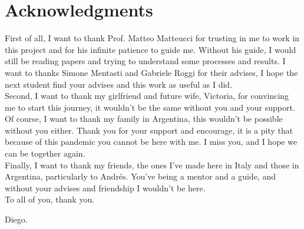 
\bigskip

\begingroup
\let\clearpage\relax
\let\cleardoublepage\relax
\let\cleardoublepage\relax
\chapter*{Acknowledgments}

First of all, I want to thank Prof. Matteo Matteucci for trusting in me to work in this project and for his infinite patience to guide me. Without his guide, I would still be reading papers and trying to understand some processes and results. I want to thanks Simone Mentasti and Gabriele Roggi for their advises, I hope the next student find your advises and this work as useful as I did.\\

Second, I want to thank my girlfriend and future wife, Victoria, for convincing me to start this journey, it wouldn't be the same without you and your support. Of course, I want to thank my family in Argentina, this wouldn't be possible without you either. Thank you for your support and encourage, it is a pity that because of this pandemic you cannot be here with me. I miss you, and I hope we can be together again.\\

Finally, I want to thank my friends, the ones I've made here in Italy and those in Argentina, particularly to Andrés. You've being a mentor and a guide, and without your advises and friendship I wouldn't be here. \\

To all of you, thank you.

\begin{flushright}
Diego.
\end{flushright}

\endgroup